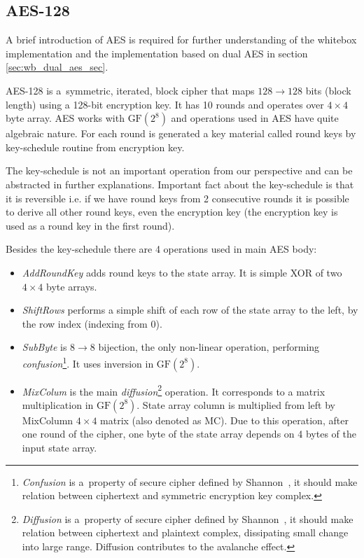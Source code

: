 \documentclass[11pt,oneside,final]{fithesis2}
\newcommand{\gfe}{\ensuremath{\text{GF}\left(2^8\right)}}
\begin{document}
    \subsection{AES-128}
    A brief introduction of AES is required for further understanding of the whitebox implementation and the implementation based on dual AES in section \ref{sec:wb_dual_aes_sec}.
    
    AES-128 is a~symmetric, iterated, block cipher that maps $128 \rightarrow 128$ bits (block length) using a 128-bit encryption key. It has 10 rounds and operates
    over $4\times4$ byte array. AES works with $\gfe$ and operations used in AES have quite algebraic nature. For each round is generated a key material called round keys
    by key-schedule routine from encryption key. 
    
    The key-schedule is not an important operation from our perspective and can be abstracted in further explanations. Important fact about the key-schedule is that it is reversible i.e. 
    if we have round keys from 2 consecutive rounds it is possible to derive all other round keys, even the encryption key (the encryption key is used as a round key in the first round).
    
    Besides the key-schedule there are 4 operations used in main AES body:
    \begin{itemize}
     \item \emph{AddRoundKey} adds round keys to the state array. It is simple XOR of two $4\times4$ byte arrays.
     \item \emph{ShiftRows} performs a simple shift of each row of the state array to the left, by the row index (indexing from 0).
     \item \emph{SubByte} is $8 \rightarrow 8$ bijection, the only non-linear operation, performing 
	\emph{confusion}\footnote{\emph{Confusion} is a~property of secure cipher defined by Shannon~\citep{shannon-otp}, it should make relation between ciphertext and symmetric encryption
	    key complex.}. It uses inversion in $\gfe$.
     \item \emph{MixColum} is the main \emph{diffusion}\footnote{\emph{Diffusion} is a~property of secure cipher defined by Shannon~\citep{shannon-otp}, it should make relation between
	    ciphertext and plaintext complex, dissipating small change into large range. Diffusion contributes to the avalanche effect. } operation. It corresponds to a matrix multiplication in $\gfe$. 
	    State array column is multiplied from left by MixColumn $4 \times 4$ matrix (also denoted as MC). Due to this operation, after one round of the cipher, 
	    one byte of the state array depends on 4 bytes of the input state array.
    \end{itemize}
    
\end{document}
